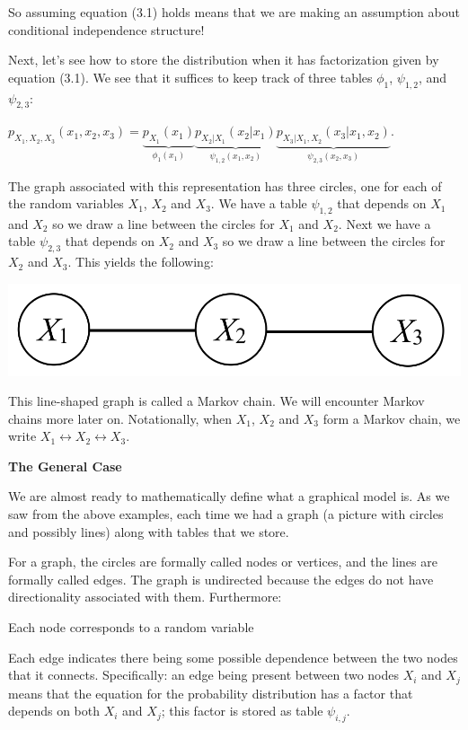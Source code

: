 \documentclass[6008notes.tex]{subfiles}
\begin{document}
So assuming equation (3.1) holds means that we are making an assumption about conditional independence structure!

Next, let's see how to store the distribution when it has factorization given by equation (3.1). We see that it suffices to keep track of three tables $\phi_1$, $\psi_{1, 2}$, and $\psi_{2, 3}$:

{\centering$p_{X_1,X_2,X_3}(x_1,x_2,x_3) = \underbrace{p_{X_1}(x_1)}_{\phi _1(x_1)} \underbrace{p_{X_2|X_1}(x_2|x_1)}_{\psi _{1, 2}(x_1, x_2)} \underbrace{p_{X_3|X_1, X_2}(x_3|x_1, x_2)}_{\psi _{2, 3}(x_2, x_3)}.$ \par}
 
The graph associated with this representation has three circles, one for each of the random variables $X_1$, $X_2$ and $X_3$. We have a table $\psi_{1, 2}$ that depends on $X_1$ and $X_2$ so we draw a line between the circles for $X_1$ and $X_2$. Next we have a table $\psi _{2, 3}$ that depends on $X_2$ and $X_3$ so we draw a line between the circles for $X_2$ and $X_3$. This yields the following:

{\centering\includegraphics[scale=0.4]{images_sec-graphical-models-3-rv-markov-chain} \par}

This line-shaped graph is called a Markov chain. We will encounter Markov chains more later on. Notationally, when $X_1$, $X_2$ and $X_3$ form a Markov chain, we write $X_1 \leftrightarrow X_2 \leftrightarrow X_3$.

\textbf{The General Case}

We are almost ready to mathematically define what a graphical model is. As we saw from the above examples, each time we had a graph (a picture with circles and possibly lines) along with tables that we store.

For a graph, the circles are formally called nodes or vertices, and the lines are formally called edges. The graph is undirected because the edges do not have directionality associated with them. Furthermore:

Each node corresponds to a random variable

Each edge indicates there being some possible dependence between the two nodes that it connects. Specifically: an edge being present between two nodes $X_i$ and $X_j$ means that the equation for the probability distribution has a factor that depends on both $X_i$ and $X_j$; this factor is stored as table $\psi_{i, j}$.
\end{document}
